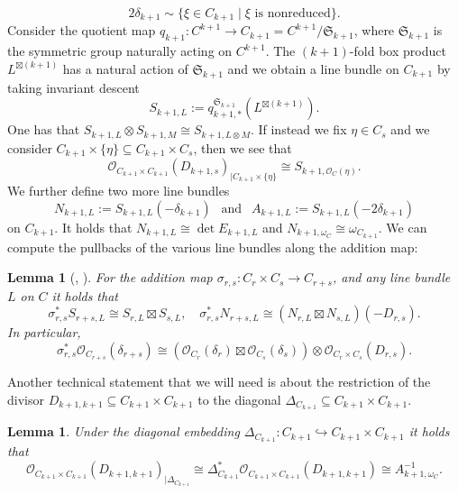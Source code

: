 \documentclass[12pt]{amsart}
\newcounter{thmcounter}
\numberwithin{equation}{section}
\numberwithin{thmcounter}{section}
\newtheorem{lemma}[thmcounter]{Lemma}
\theoremstyle{definition}
\theoremstyle{claim}
\newcommand{\sO}{\mathscr{O}}
\begin{document}
$$
2\delta_{k+1} \sim  \{ \xi \in C_{k+1} \mid \text{$\xi$ is nonreduced} \}.
$$
Consider the quotient map $q_{k+1} \colon C^{k+1} \to C_{k+1}=C^{k+1}/\mathfrak{S}_{k+1}$, where $\mathfrak{S}_{k+1}$ is the symmetric group naturally acting on $C^{k+1}$. The $(k+1)$-fold box product $L^{\boxtimes (k+1)}$ has a natural action of $\mathfrak{S}_{k+1}$ and we obtain a line bundle on $C_{k+1}$ by taking invariant descent
\[ S_{k+1,L} := q_{k+1,*}^{\mathfrak{S}_{k+1}}(L^{\boxtimes (k+1)}). \]
One has that $S_{k+1,L}\otimes S_{k+1,M} \cong S_{k+1,L\otimes M}$. 
If instead we fix $\eta\in C_s$ and we consider $C_{k+1}\times \{\eta\} \subseteq C_{k+1}\times C_s$, then we see that
\[ \sO_{C_{k+1} \times C_{k+1}} (D_{k+1,s})_{|C_{k+1}\times \{\eta\}} \cong S_{k+1,\sO_C(\eta)}. \]
We further define two more line bundles
$$
N_{k+1, L}:=S_{k+1,L}(-\delta_{k+1})~~\text{ and }~~A_{k+1,L}:=S_{k+1,L}(-2\delta_{k+1})
$$
on $C_{k+1}$. It holds that $N_{k+1,L} \cong \det E_{k+1,L}$ and $N_{k+1,\omega_C} \cong \omega_{C_{k+1}}$.
We can compute the pullbacks of the various line bundles along the addition map:

\begin{lemma}[{\cite[Lemma 3.1]{agostini}, \cite[Lemma 2.3]{NP}}]\label{lem:pullbackdeltaviaaddmap}
For the addition map $\sigma_{r,s} \colon C_r \times C_s \to C_{r+s}$, and any line bundle $L$ on $C$ it holds that
\[
\sigma_{r,s}^*S_{r+s,L} \cong S_{r,L}\boxtimes S_{s,L}, \quad
\sigma_{r,s}^*N_{r+s,L} \cong (N_{r,L}\boxtimes N_{s,L})(-D_{r,s}).
\]
In particular,
\[
 \sigma_{r,s}^*\sO_{C_{r+s}}(\delta_{r+s})  \cong (\sO_{C_r}(\delta_r) \boxtimes \sO_{C_s}(\delta_s)) \otimes \sO_{C_r \times C_s}(D_{r,s}) .
\]
\end{lemma}

Another technical statement that we will need is about the restriction of the divisor $D_{k+1,k+1} \subseteq C_{k+1}\times C_{k+1}$ to the diagonal $\Delta_{C_{k+1}} \subseteq C_{k+1}\times C_{k+1}$.


\begin{lemma}\label{lem:D|_Delta}
	Under the diagonal embedding $\Delta_{C_{k+1}}\colon C_{k+1} \hookrightarrow C_{k+1}\times C_{k+1}$ it holds that
	$$
   \sO_{C_{k+1} \times C_{k+1}} (D_{k+1,k+1})_{|\Delta_{C_{k+1}}} \cong \Delta^*_{C_{k+1}}\sO_{C_{k+1} \times C_{k+1}} (D_{k+1,k+1}) \cong A^{-1}_{k+1, \omega_C}.
	$$
\end{lemma}
\end{document}
